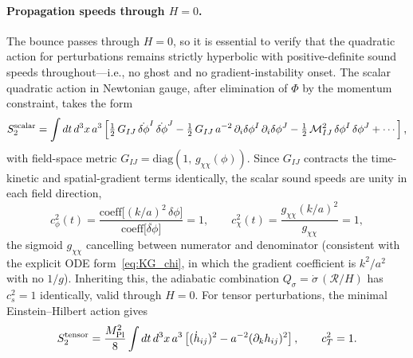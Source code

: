 \documentclass[11pt,a4paper]{article}
\begin{document}
\paragraph{Propagation speeds through $H = 0$.}
The bounce passes through $H = 0$, so it is essential to verify that the quadratic action for perturbations remains strictly hyperbolic with positive-definite sound speeds throughout---i.e., no ghost and no gradient-instability onset. The scalar quadratic action in Newtonian gauge, after elimination of $\Phi$ by the momentum constraint, takes the form
\begin{equation}
\label{eq:S2_scalar}
S_2^{\rm scalar} = \int dt\,d^3x\,a^3\left[ \tfrac{1}{2}\,G_{IJ}\,\dot{\delta\phi}^I\,\dot{\delta\phi}^J - \tfrac{1}{2}\,G_{IJ}\,a^{-2}\,\partial_i\delta\phi^I\,\partial_i\delta\phi^J - \tfrac{1}{2}\,\mathcal{M}^2_{IJ}\,\delta\phi^I\,\delta\phi^J + \cdots \right],
\end{equation}
with field-space metric $G_{IJ} = \mathrm{diag}(1,\,g_{\chi\chi}(\phi))$. Since $G_{IJ}$ contracts the time-kinetic and spatial-gradient terms identically, the scalar sound speeds are unity in each field direction,
\begin{equation}
c_\phi^2(t) = \frac{\text{coeff}\big[(k/a)^2\,\delta\phi\big]}{\text{coeff}\big[\ddot{\delta\phi}\big]} = 1,
\qquad
c_\chi^2(t) = \frac{g_{\chi\chi}(k/a)^2}{g_{\chi\chi}} = 1,
\end{equation}
the sigmoid $g_{\chi\chi}$ cancelling between numerator and denominator (consistent with the explicit ODE form~\eqref{eq:KG_chi}, in which the gradient coefficient is $k^2/a^2$ with no $1/g$). Inheriting this, the adiabatic combination $Q_\sigma = \dot\sigma\,(\mathcal{R}/H)$ has $c_s^2 = 1$ identically, valid through $H = 0$. For tensor perturbations, the minimal Einstein--Hilbert action gives
\begin{equation}
S_2^{\rm tensor} = \frac{M_{\rm Pl}^2}{8}\int dt\,d^3x\,a^3\left[(\dot h_{ij})^2 - a^{-2}(\partial_k h_{ij})^2\right], \qquad c_T^2 = 1.
\end{equation}
\end{document}
